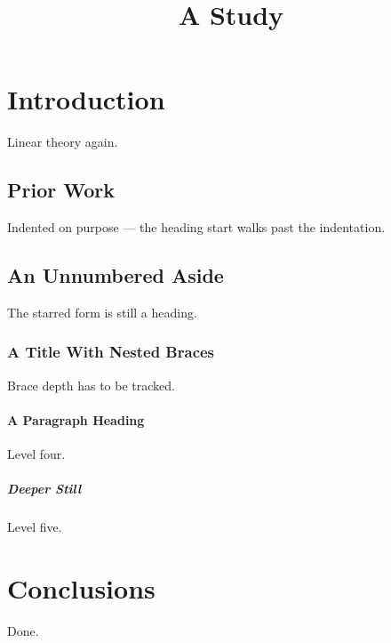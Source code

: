 \documentclass{article}
\begin{document}
\title{A Study}
\maketitle

\section{Introduction}
Linear theory again.

  \subsection{Prior Work}
Indented on purpose --- the heading start walks past the indentation.

\subsection*{An Unnumbered Aside}
The starred form is still a heading.

\subsubsection{A Title With {Nested} Braces}
Brace depth has to be tracked.

\paragraph{A Paragraph Heading}
Level four.

\subparagraph{Deeper Still}
Level five.

\section{Conclusions}
Done.
\end{document}
